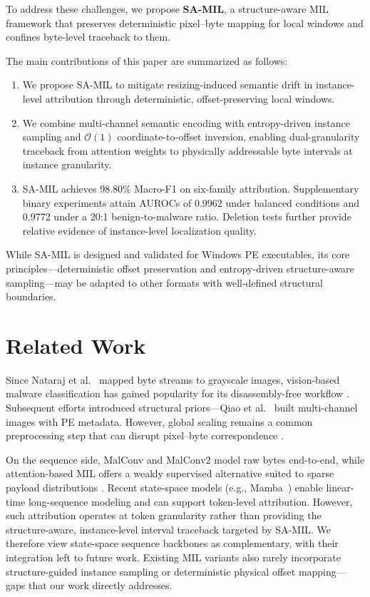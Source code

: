 \documentclass[runningheads]{llncs}
\begin{document}
To address these challenges, we propose \textbf{SA-MIL}, a structure-aware MIL framework that preserves deterministic pixel--byte mapping for local windows and confines byte-level traceback to them.

The main contributions of this paper are summarized as follows:
\begin{enumerate}
    \item We propose SA-MIL to mitigate resizing-induced semantic drift in instance-level attribution through deterministic, offset-preserving local windows.
    \item We combine multi-channel semantic encoding with entropy-driven instance sampling and $\mathcal{O}(1)$ coordinate-to-offset inversion, enabling dual-granularity traceback from attention weights to physically addressable byte intervals at instance granularity.
    \item SA-MIL achieves 98.80\% Macro-F1 on six-family attribution. Supplementary binary experiments attain AUROCs of 0.9962 under balanced conditions and 0.9772 under a 20:1 benign-to-malware ratio. Deletion tests further provide relative evidence of instance-level localization quality.
\end{enumerate}

While SA-MIL is designed and validated for Windows PE executables, its core principles---deterministic offset preservation and entropy-driven structure-aware sampling---may be adapted to other formats with well-defined structural boundaries.

\section{Related Work}
\label{sec:related_work}

Since Nataraj et al.\ \cite{nataraj2011malware} mapped byte streams to grayscale images, vision-based malware classification has gained popularity for its disassembly-free workflow \cite{vasan2020image,gibert2020survey}. Subsequent efforts introduced structural priors---Qiao et al.\ \cite{qiao2019multi} built multi-channel images with PE metadata. However, global scaling remains a common preprocessing step that can disrupt pixel--byte correspondence \cite{nadeem2023sok}.

On the sequence side, MalConv \cite{raff2017malware} and MalConv2 \cite{raff2021classifying} model raw bytes end-to-end, while attention-based MIL \cite{ilse2018attention} offers a weakly supervised alternative suited to sparse payload distributions \cite{stiborek2018multiple}. Recent state-space models (e.g., Mamba~\cite{gu2023mamba}) enable linear-time long-sequence modeling and can support token-level attribution. However, such attribution operates at token granularity rather than providing the structure-aware, instance-level interval traceback targeted by SA-MIL. We therefore view state-space sequence backbones as complementary, with their integration left to future work. Existing MIL variants also rarely incorporate structure-guided instance sampling or deterministic physical offset mapping---gaps that our work directly addresses.
\end{document}
